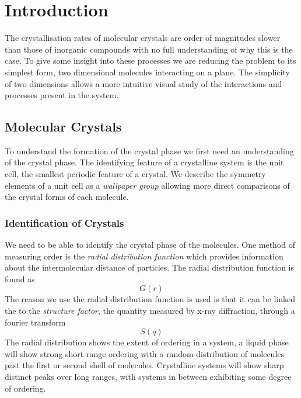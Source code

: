 \chapter {Introduction}

The crystallisation rates of molecular crystals are order of magnitudes slower than those of inorganic compounds with no full understanding of why this is the case. To give some insight into these processes we are reducing the problem to its simplest form, two dimensional molecules interacting on a plane. The simplicity of two dimensions allows a more intuitive visual study of the interactions and processes present in the system.

\section{Molecular Crystals}
\label{sec:molecular crystals}

To understand the formation of the crystal phase we first need an understanding of the crystal phase. The identifying feature of a crystalline system is the unit cell, the smallest periodic feature of a crystal. We describe the symmetry elements of a unit cell as a \emph{wallpaper group} allowing more direct comparisons of the crystal forms of each molecule.

\subsection{Identification of Crystals}

We need to be able to identify the crystal phase of the molecules. One method of measuring order is the \emph{radial distribution function} which provides information about the intermolecular distance of particles. The radial distribution function is found as
\begin{equation}
    G(r)
\end{equation}
 The reason we use the radial distribution function is used is that it can be linked the to the \emph{structure factor}, the quantity measured by x-ray diffraction, through a fourier transform
 \begin{equation}
     S(q)
 \end{equation}
The radial distribution shows the extent of ordering in a system, a liquid phase will show strong short range ordering with a random distribution of molecules past the first or second shell of molecules. Crystalline systems will show sharp distinct peaks over long ranges, with systems in between exhibiting some degree of ordering.


